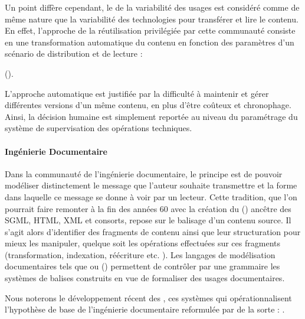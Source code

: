 Un point diffère cependant, le  de la variabilité des usages est considéré comme de même nature que la variabilité des technologies pour transférer et lire le contenu. 
En effet, l'approche de la réutilisation privilégiée par cette communauté consiste en une transformation automatique du contenu en fonction des paramètres d'un scénario de distribution et de lecture : 

 (\cite{Singh2004}).

L'approche automatique est justifiée par la difficulté à maintenir et gérer différentes versions d'un même contenu, en plus d'être coûteux et chronophage.
Ainsi, la décision humaine est simplement reportée au niveau du paramétrage du système de supervisation des opérations techniques.\\


\paragraph{Ingénierie Documentaire}
Dans la communauté de l'ingénierie documentaire, le principe est de pouvoir modéliser distinctement le message que l'auteur souhaite transmettre et la forme dans laquelle ce message se donne à voir par un lecteur. 
Cette tradition, que l'on pourrait faire remonter à la fin des années 60 avec la création du  (\cite{Goldfarb}) ancêtre des SGML, HTML, XML et consorts, repose sur le balisage d'un contenu source. 
Il s'agit alors d'identifier des fragments de contenu ainsi que leur structuration pour mieux les manipuler, quelque soit les opérations effectuées sur ces fragments (transformation, indexation, réécriture etc. \cite[chap.5.2]{Bachimont2004}). 
Les langages de modélisation documentaires tels que  ou  (\cite{Fallside2004}) permettent de contrôler par une grammaire les systèmes de balises construits en vue de formaliser des usages documentaires. 

Nous noterons le développement récent des , ces systèmes qui opérationnalisent l'hypothèse de base de l'ingénierie documentaire reformulée par \cite{Crozat2004} de la sorte : . 

